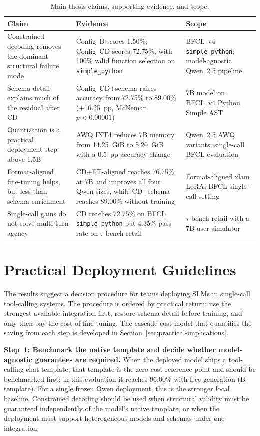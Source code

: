 \begin{table}[ht]
\centering
\caption{Main thesis claims, supporting evidence, and scope.}
\label{tab:claim-evidence-scope}
\begin{tabular}{p{3.6cm} p{5.2cm} p{4.2cm}}
\toprule
Claim & Evidence & Scope \\
\midrule
Constrained decoding removes the dominant structural failure mode &
Config~B scores 1.50\%; Config~CD scores 72.75\%, with 100\% valid function selection on \texttt{simple\_python} &
BFCL~v4 \texttt{simple\_python}; model-agnostic Qwen~2.5 pipeline \\
Schema detail explains much of the residual after CD &
Config~CD+schema raises accuracy from 72.75\% to 89.00\% ($+$16.25~pp, McNemar $p < 0.00001$) &
7B model on BFCL~v4 Python Simple AST \\
Quantization is a practical deployment step above 1.5B &
AWQ INT4 reduces 7B memory from 14.25~GiB to 5.20~GiB with a 0.5~pp accuracy change &
Qwen~2.5 AWQ variants; single-call BFCL evaluation \\
Format-aligned fine-tuning helps, but less than schema enrichment &
CD+FT-aligned reaches 76.75\% at 7B and improves all four Qwen sizes, while CD+schema reaches 89.00\% without training &
Format-aligned xlam LoRA; BFCL single-call setting \\
Single-call gains do not solve multi-turn agency &
CD reaches 72.75\% on BFCL \texttt{simple\_python} but 4.35\% pass rate on $\tau$-bench retail &
$\tau$-bench retail with a 7B user simulator \\
\bottomrule
\end{tabular}
\end{table}

\section{Practical Deployment Guidelines}

The results suggest a decision procedure for teams deploying SLMs in
single-call tool-calling systems. The procedure is ordered by practical return:
use the strongest available integration first, restore schema detail before
training, and only then pay the cost of fine-tuning. The cascade cost model that
quantifies the saving from each step is developed in
Section~\ref{sec:practical-implications}.

\textbf{Step~1: Benchmark the native template and decide whether model-agnostic
guarantees are required.}
When the deployed model ships a tool-calling chat template, that template is the
zero-cost reference point and should be benchmarked first; in this evaluation it
reaches 96.00\% with free generation (B-template). For a single frozen Qwen
deployment, this is the stronger local baseline. Constrained decoding should be
used when structural validity must be guaranteed independently of the model's
native template, or when the deployment must support heterogeneous models and
schemas under one integration.

